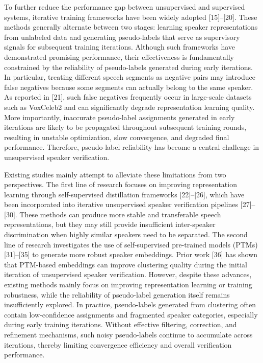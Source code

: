 \documentclass[lettersize,journal]{IEEEtran}
\begin{document}
To further reduce the performance gap between unsupervised and supervised systems, iterative training frameworks have been widely adopted [15]--[20]. These methods generally alternate between two stages: learning speaker representations from unlabeled data and generating pseudo-labels that serve as supervisory signals for subsequent training iterations. Although such frameworks have demonstrated promising performance, their effectiveness is fundamentally constrained by the reliability of pseudo-labels generated during early iterations. In particular, treating different speech segments as negative pairs may introduce false negatives because some segments can actually belong to the same speaker. As reported in [21], such false negatives frequently occur in large-scale datasets such as VoxCeleb2 and can significantly degrade representation learning quality. More importantly, inaccurate pseudo-label assignments generated in early iterations are likely to be propagated throughout subsequent training rounds, resulting in unstable optimization, slow convergence, and degraded final performance. Therefore, pseudo-label reliability has become a central challenge in unsupervised speaker verification.

Existing studies mainly attempt to alleviate these limitations from two perspectives. The first line of research focuses on improving representation learning through self-supervised distillation frameworks [22]--[26], which have been incorporated into iterative unsupervised speaker verification pipelines [27]--[30]. These methods can produce more stable and transferable speech representations, but they may still provide insufficient inter-speaker discrimination when highly similar speakers need to be separated. The second line of research investigates the use of self-supervised pre-trained models (PTMs) [31]--[35] to generate more robust speaker embeddings. Prior work [36] has shown that PTM-based embeddings can improve clustering quality during the initial iteration of unsupervised speaker verification. However, despite these advances, existing methods mainly focus on improving representation learning or training robustness, while the reliability of pseudo-label generation itself remains insufficiently explored. In practice, pseudo-labels generated from clustering often contain low-confidence assignments and fragmented speaker categories, especially during early training iterations. Without effective filtering, correction, and refinement mechanisms, such noisy pseudo-labels continue to accumulate across iterations, thereby limiting convergence efficiency and overall verification performance.
\end{document}
